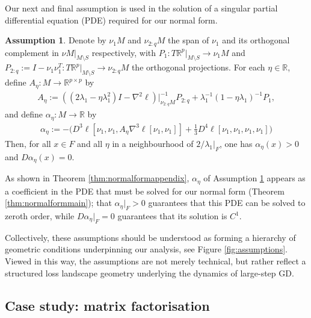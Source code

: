 \documentclass{article}
\newcommand{\RB}{\mathbb{R}}
\theoremstyle{plain}
\theoremstyle{definition}
\newtheorem{assumption}[theorem]{Assumption}
\theoremstyle{remark}
\begin{document}
Our next and final assumption is used in the solution of a singular partial differential equation (PDE) required for our normal form.

\begin{assumption}\label{ass:quality}
    Denote by $\nu_1M$ and $\nu_{2:q}M$ the span of $\nu_1$ and its orthogonal complement in $\nu M|_{M\setminus S}$ respectively, with $P_1:T\RB^p|_{M\setminus S}\rightarrow\nu_1M$ and $P_{2:q}:=I-\nu_1\nu_1^T:T\RB^p|_{M\setminus S}\rightarrow \nu_{2:q}M$ the orthogonal projections. For each $\eta\in\RB$, define $A_{\eta}:M\rightarrow \RB^{p\times p}$ by
    \begin{align}
    A_{\eta}:=((2\lambda_1-\eta\lambda_1^2)I-\nabla^2\ell)|_{\nu_{2:q}M}^{-1}P_{2:q} + \lambda_1^{-1}(1-\eta\lambda_1)^{-1}P_1,
    \end{align}
    and define $\alpha_{\eta}:M\rightarrow \RB$ by
    \begin{align}
    \alpha_{\eta}:=-\bigg(D^3\ell[\nu_1,\nu_1,A_{\eta}\nabla^3\ell[\nu_1,\nu_1]] + \frac{1}{3}D^4\ell[\nu_1,\nu_1,\nu_1,\nu_1]\bigg)
    \end{align}
    Then, for all $x\in F$ and all $\eta$ in a neighbourhood of $2/\lambda_1|_F$, one has $\alpha_{\eta}(x)>0$ and $D\alpha_{\eta}(x) = 0$.
\end{assumption}

As shown in Theorem \ref{thm:normalformappendix}, $\alpha_{\eta}$ of Assumption \ref{ass:quality} appears as a coefficient in the PDE that must be solved for our normal form (Theorem \ref{thm:normalformmain}); that $\alpha_{\eta}|_F>0$ guarantees that this PDE can be solved to zeroth order, while $D\alpha_{\eta}|_F =0$ guarantees that its solution is $C^1$.

Collectively, these assumptions should be understood as forming a hierarchy of geometric conditions underpinning our analysis, see Figure \ref{fig:assumptions}. Viewed in this way, the assumptions are not merely technical, but rather reflect a structured loss landscape geometry underlying the dynamics of large-step GD.

\subsection{Case study: matrix factorisation}\label{subsec:mf}
\end{document}
